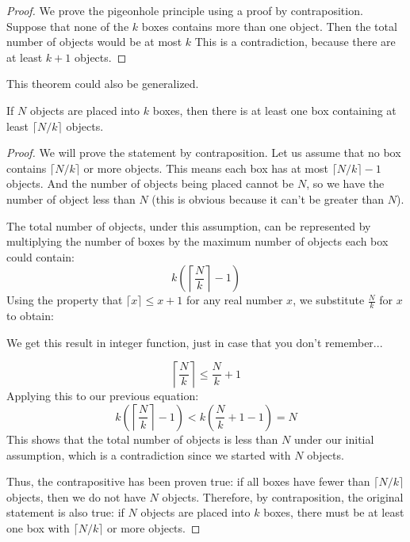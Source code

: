         \begin{proof}
            We prove the pigeonhole principle using a proof by contraposition. Suppose that none of the $k$ boxes contains more than one object. Then the total number of objects would be 
            at most $k$ This is a contradiction, because there are at least $k+1$ objects.
        \end{proof}
        This theorem could also be generalized.
        \begin{theorem}
            If \( N \) objects are placed into \( k \) boxes, then there is at least one box containing at least \( \lceil N/k \rceil \) objects.
            \end{theorem}
            
            \begin{proof}
            We will prove the statement by contraposition. Let us assume that no box contains \( \lceil N/k \rceil \) or more objects. This means each box has at most \( \lceil N/k \rceil - 1 \) objects.
            And the number of objects being placed cannot be $N$, so we have the number of object less than $N$ (this is obvious because it can't be greater than $N$). 
            
            The total number of objects, under this assumption, can be represented by multiplying the number of boxes by the maximum number of objects each box could contain:
            \[
            k \left( \left\lceil \frac{N}{k} \right\rceil - 1 \right)
            \]
            Using the property that \( \lceil x \rceil \leq x + 1 \) for any real number \( x \), we substitute \( \frac{N}{k} \) for \( x \) to obtain:
            \begin{remark}
                We get this result in integer function, just in case that you don't remember...
            \end{remark}
            \[
            \left\lceil \frac{N}{k} \right\rceil \leq \frac{N}{k} + 1
            \]
            Applying this to our previous equation:
            \[
            k \left( \left\lceil \frac{N}{k} \right\rceil - 1 \right) < k \left( \frac{N}{k} + 1 - 1 \right) = N
            \]
            This shows that the total number of objects is less than \( N \) under our initial assumption, which is a contradiction since we started with \( N \) objects.
            
            Thus, the contrapositive has been proven true: if all boxes have fewer than \( \lceil N/k \rceil \) objects, then we do not have \( N \) objects. Therefore, by contraposition, the original statement is also true: if \( N \) objects are placed into \( k \) boxes, there must be at least one box with \( \lceil N/k \rceil \) or more objects.
            \end{proof}
            
